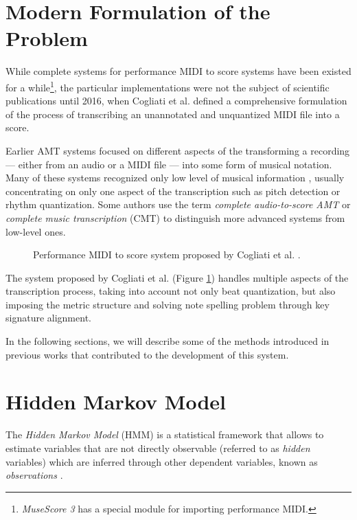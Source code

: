 \section{Modern Formulation of the Problem}

While complete systems for performance MIDI to score systems have been existed for a while\footnote{\emph{MuseScore 3} has a special module for importing performance MIDI. \missing}, the particular implementations were not the subject of scientific publications until 2016, when Cogliati et al. defined a comprehensive formulation of the process of transcribing an unannotated and unquantized MIDI file into a score. 

Earlier AMT systems focused on different aspects of the transforming a recording --- either from an audio or a MIDI file --- into some form of musical notation. Many of these systems recognized only low level of musical information \cite{Cogliati2016}, usually concentrating on only one aspect of the transcription such as pitch detection or rhythm quantization. Some authors use the term \emph{complete audio-to-score AMT} \cite{Foscarin2020} or \emph{complete music transcription} (CMT) \cite{Ycart2018} to distinguish more advanced systems from low-level ones.

\begin{figure}[!ht]
\centering

\caption[Performance MIDI to score system proposed by Cogliati et al.]{Performance MIDI to score system proposed by Cogliati et al. \cite{Cogliati2016}.}
\label{transcription_system}
\end{figure}

The system proposed by Cogliati et al. (Figure \ref{transcription_system}) handles multiple aspects of the transcription process, taking into account not only beat quantization, but also imposing the metric structure and solving note spelling problem through key signature alignment.

In the following sections, we will describe some of the methods introduced in previous works that contributed to the development of this system.

\section{Hidden Markov Model}

The \emph{Hidden Markov Model} (HMM) is a statistical framework that allows to estimate variables that are not directly observable (referred to as \emph{hidden} variables) which are inferred through other dependent variables, known as \emph{observations} \cite[p. 210--213]{Jurafsky2009}.

